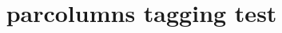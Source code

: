 \documentclass{article}
\title{parcolumns tagging test}
\begin{document}
\begin{parcolumns}{2}
\colplacechunks
\end{parcolumns}
\end{document}
